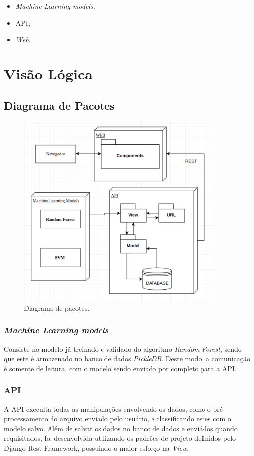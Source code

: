 \begin{apendicesenv}
    \begin{itemize}
        \item \textit{Machine Learning models};
        \item API;
        \item \textit{Web}.
    \end{itemize}


   \section{Visão Lógica}
   \subsection{Diagrama de Pacotes}
   \begin{figure}[!htb]
        \centering
        \includegraphics[width=0.9\textwidth]{figuras/diagrama_pacotes.eps}
        \caption{Diagrama de pacotes.}
        \label{diagramadepacotes}
    \end{figure}
    \subsubsection{\textit{Machine Learning models}}
    Consiste no modelo já treinado e validado do algoritmo \textit{Random Forest}, sendo que este é armazenado no banco de dados \textit{PickleDB}. Deste modo, a comunicação é somente de leitura, com o modelo sendo enviado por completo para a API.

    \subsubsection{API}
    A API execulta todas as manipulações envolvendo os dados, como o pré-processamento do arquivo enviado pelo usuário, e classificando estes com o modelo salvo. Além de salvar os dados no banco de dados e enviá-los quando requisitados, foi desenvolvida utilizando os padrões de projeto definidos pelo Django-Rest-Framework, possuindo o maior esforço na \textit{View}.


\end{apendicesenv}
